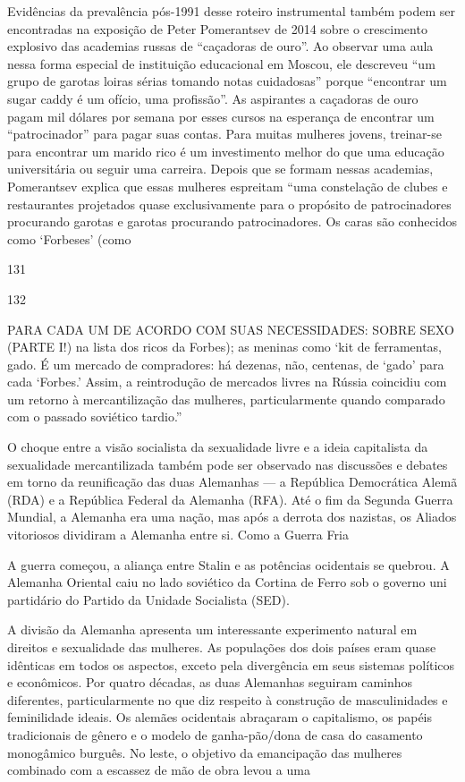  \par 
Evidências da prevalência pós-1991 desse roteiro instrumental também podem ser encontradas na exposição de Peter Pomerantsev de 2014 sobre o crescimento explosivo das academias russas de “caçadoras de ouro”. Ao observar uma aula nessa forma especial de instituição educacional em Moscou, ele descreveu “um grupo de garotas loiras sérias tomando notas cuidadosas” porque “encontrar um sugar caddy é um ofício, uma profissão”. As aspirantes a caçadoras de ouro pagam mil dólares por semana por esses cursos na esperança de encontrar um “patrocinador” para pagar suas contas. Para muitas mulheres jovens, treinar-se para encontrar um marido rico é um investimento melhor do que uma educação universitária ou seguir uma carreira. Depois que se formam nessas academias, Pomerantsev explica que essas mulheres espreitam “uma constelação de clubes e restaurantes projetados quase exclusivamente para o propósito de patrocinadores procurando garotas e garotas procurando patrocinadores. Os caras são conhecidos como ‘Forbeses’ (como
 \par 
131
 \par 
132
 \par 
PARA CADA UM DE ACORDO COM SUAS NECESSIDADES: SOBRE SEXO (PARTE I!) na lista dos ricos da Forbes); as meninas como ‘kit de ferramentas, gado. É um mercado de compradores: há dezenas, não, centenas, de ‘gado’ para cada ‘Forbes.’ Assim, a reintrodução de mercados livres na Rússia coincidiu com um retorno à mercantilização das mulheres, particularmente quando comparado com o passado soviético tardio.”
 \par 
O choque entre a visão socialista da sexualidade livre e a ideia capitalista da sexualidade mercantilizada também pode ser observado nas discussões e debates em torno da reunificação das duas Alemanhas — a República Democrática Alemã (RDA) e a República Federal da Alemanha (RFA). Até o fim da Segunda Guerra Mundial, a Alemanha era uma nação, mas após a derrota dos nazistas, os Aliados vitoriosos dividiram a Alemanha entre si. Como a Guerra Fria
 \par 
A guerra começou, a aliança entre Stalin e as potências ocidentais se quebrou. A Alemanha Oriental caiu no lado soviético da Cortina de Ferro sob o governo uni partidário do Partido da Unidade Socialista (SED).
 \par 
A divisão da Alemanha apresenta um interessante experimento natural em direitos e sexualidade das mulheres. As populações dos dois países eram quase idênticas em todos os aspectos, exceto pela divergência em seus sistemas políticos e econômicos. Por quatro décadas, as duas Alemanhas seguiram caminhos diferentes, particularmente no que diz respeito à construção de masculinidades e feminilidade ideais. Os alemães ocidentais abraçaram o capitalismo, os papéis tradicionais de gênero e o modelo de ganha-pão/dona de casa do casamento monogâmico burguês. No leste, o objetivo da emancipação das mulheres combinado com a escassez de mão de obra levou a uma
